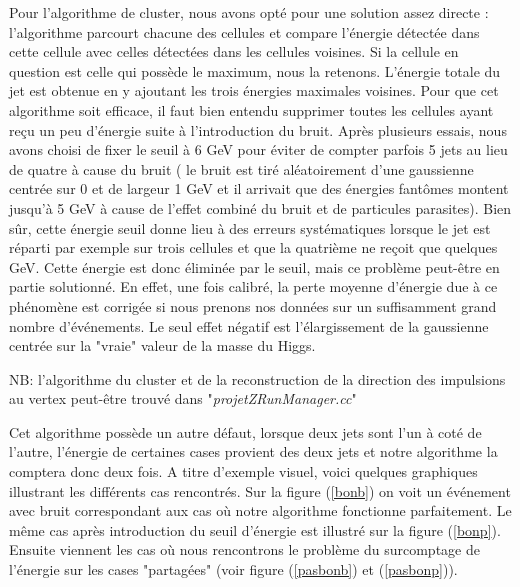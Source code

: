 \documentclass[11pt]{article}
\begin{document}
Pour l'algorithme de cluster, nous avons opté pour une solution assez directe :
l'algorithme parcourt chacune des cellules et compare l'énergie
détectée dans cette cellule avec celles détectées dans les cellules voisines.
Si la cellule en question est celle qui possède le maximum, nous la retenons.
L'énergie totale du jet est obtenue en y ajoutant les trois énergies
maximales voisines. Pour que cet algorithme soit efficace, il faut bien entendu
supprimer toutes les cellules ayant reçu un peu d'énergie suite à
l'introduction du bruit. Après
plusieurs essais, nous avons choisi de fixer le seuil à 6 GeV pour éviter de
compter parfois 5 jets au lieu de quatre à cause du bruit ( le bruit est tiré
aléatoirement d'une gaussienne centrée sur 0 et de largeur 1 GeV et il arrivait
que des énergies fantômes montent jusqu'à 5 GeV à cause de l'effet combiné du
bruit et de particules parasites). Bien sûr, cette énergie seuil
donne lieu à des erreurs systématiques lorsque le jet est réparti par exemple
sur trois cellules et que la quatrième ne reçoit que quelques GeV. Cette
énergie est donc éliminée par le seuil, mais ce problème peut-être en partie
solutionné. En effet, une fois calibré, la perte moyenne d'énergie due à ce
phénomène est corrigée si nous prenons nos données sur un suffisamment grand
nombre d'événements. Le seul effet négatif est l'élargissement de la gaussienne
centrée sur la "vraie" valeur de la masse du Higgs.

NB: l'algorithme du cluster et de la reconstruction de la direction des
impulsions au vertex peut-être trouvé dans "\textit{projetZRunManager.cc}"

Cet algorithme possède un autre défaut, lorsque deux jets sont l'un à coté de
l'autre, l'énergie de certaines cases provient des deux jets et notre
algorithme la comptera donc deux fois. A titre d'exemple visuel, voici quelques
graphiques illustrant les différents cas rencontrés. Sur la figure (\ref{bonb})
on voit un événement avec bruit correspondant aux cas où notre algorithme
fonctionne parfaitement. Le même cas après introduction du seuil d'énergie est
illustré sur la figure (\ref{bonp}). Ensuite viennent les cas où nous
rencontrons le problème du surcomptage de l'énergie sur les cases "partagées"
(voir figure (\ref{pasbonb}) et (\ref{pasbonp})).
\end{document}
